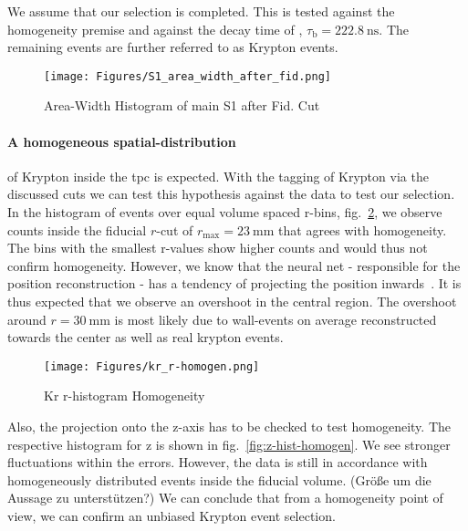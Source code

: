 We assume that our selection is completed.
This is tested against the homogeneity premise and against the decay time of , $\tau_\mathrm{b} = \SI{222.8}{\nano\s}$.
The remaining events are further referred to as Krypton events.


\begin{figure}
\centering
\texttt{[image: Figures/S1\_area\_width\_after\_fid.png]}  %
\caption[Area-Width Histogram of main S1 after Fid. Cut]{
        Area-Width Histogram of main S1 after Fid. Cut
    }
\label{fig:main_s1_area_width}
\end{figure}


\paragraph{A homogeneous spatial-distribution} of Krypton inside the \gls{tpc} is expected.
With the tagging of Krypton via the discussed cuts we can test this hypothesis against the data to test our selection.
In the histogram of events over equal volume spaced r-bins, fig.~\ref{fig:r-hist-homogen}, we observe counts inside the fiducial $ r $-cut of $r_\mathrm{max} = \SI{23}{\milli\m}$ that agrees with homogeneity.
The bins with the smallest r-values show higher counts and would thus not confirm homogeneity.
However, we know that the neural net - responsible for the position reconstruction - has a tendency of projecting the position inwards~\cite{ABism}.
It is thus expected that we observe an overshoot in the central region.
The overshoot around $ r = \SI{30}{\milli\m} $ is most likely due to wall-events on average reconstructed towards the center as well as real krypton events.

\begin{figure}
\centering
\texttt{[image: Figures/kr\_r-homogen.png]}  %
\caption[Kr r-histogram Homogeneity]{
        Kr r-histogram Homogeneity
    }
\label{fig:r-hist-homogen}
\end{figure}

Also, the projection onto the z-axis has to be checked to test homogeneity.
The respective histogram for z is shown in fig.~\ref{fig:z-hist-homogen}.
We see stronger fluctuations within the errors.
However, the data is still in accordance with homogeneously distributed events inside the fiducial volume.
(Größe um die Aussage zu unterstützen?)
We can conclude that from a homogeneity point of view, we can confirm an unbiased Krypton event selection.

